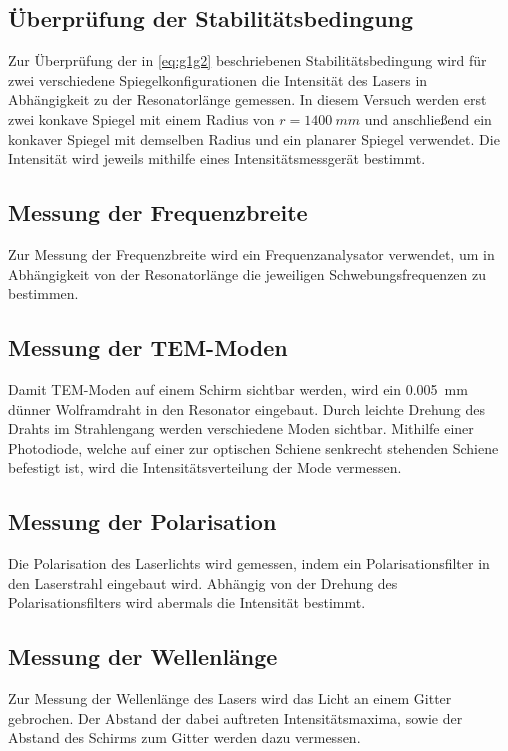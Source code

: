 \subsection{Überprüfung der Stabilitätsbedingung}
Zur Überprüfung der in \autoref{eq:g1g2} beschriebenen Stabilitätsbedingung wird für zwei verschiedene Spiegelkonfigurationen die Intensität
des Lasers in Abhängigkeit zu der Resonatorlänge gemessen. In diesem Versuch werden erst zwei konkave Spiegel mit einem Radius von 
$r=\qty{1400}{mm}$ und anschließend ein konkaver Spiegel mit demselben Radius und ein planarer Spiegel verwendet. Die Intensität wird 
jeweils mithilfe eines Intensitätsmessgerät bestimmt.

\subsection{Messung der Frequenzbreite}
Zur Messung der Frequenzbreite wird ein Frequenzanalysator verwendet, um in Abhängigkeit von der Resonatorlänge die jeweiligen 
Schwebungsfrequenzen zu bestimmen.

\subsection{Messung der TEM-Moden}
Damit TEM-Moden auf einem Schirm sichtbar werden, wird ein \qty{0.005}{\milli\metre} dünner Wolframdraht in den Resonator eingebaut.
Durch leichte Drehung des Drahts im Strahlengang werden verschiedene Moden sichtbar. Mithilfe einer Photodiode, welche auf einer zur optischen
Schiene senkrecht stehenden Schiene befestigt ist, wird die Intensitätsverteilung der Mode vermessen.

\subsection{Messung der Polarisation}
Die Polarisation des Laserlichts wird gemessen, indem ein Polarisationsfilter in den Laserstrahl eingebaut wird. Abhängig von der Drehung
des Polarisationsfilters wird abermals die Intensität bestimmt.

\subsection{Messung der Wellenlänge}
Zur Messung der Wellenlänge des Lasers wird das Licht an einem Gitter gebrochen. Der Abstand der dabei auftreten Intensitätsmaxima, sowie der Abstand des Schirms
zum Gitter werden dazu vermessen. 
